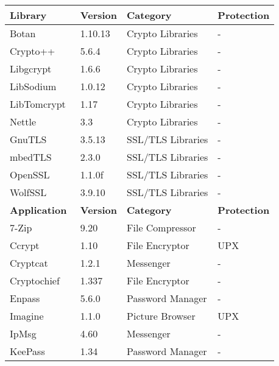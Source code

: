 \begin{table}[t]
\scriptsize 
\centering
\begin{tabular}{p{2cm} p{0.8cm} p{2.1cm} p{1.5cm} }
\toprule
\textbf{Library}						& \textbf{Version}	& \textbf{Category}		& \textbf{Protection} \\ 
\midrule
{Botan~\cite{botan_cryptozoo}}				& {1.10.13}			& {Crypto Libraries}		& - \\
{Crypto++~\cite{cryptopp_cryptozoo}}		& {5.6.4}			& {Crypto Libraries}		& - \\
{Libgcrypt~\cite{libgcrypt_cryptozoo}}		& {1.6.6}			& {Crypto Libraries}		& - \\
{LibSodium~\cite{libsodium_cryptozoo}}		& {1.0.12}			& {Crypto Libraries}		& - \\
{LibTomcrypt~\cite{libtomcrypt_cryptozoo}}	& {1.17}			& {Crypto Libraries}		& - \\
{Nettle~\cite{nettle_cryptozoo}}			& {3.3}				& {Crypto Libraries}		& - \\
\midrule
{GnuTLS~\cite{gnutls_cryptozoo}}			& {3.5.13}			& {SSL/TLS Libraries}		& - \\
{mbedTLS~\cite{mbedtls_cryptozoo}}			& {2.3.0}			& {SSL/TLS Libraries}		& - \\
{OpenSSL~\cite{openssl_cryptozoo}}			& {1.1.0f}			& {SSL/TLS Libraries}		& - \\
{WolfSSL~\cite{wolfssl_cryptozoo}}			& {3.9.10}			& {SSL/TLS Libraries}		& - \\ 
\bottomrule
\toprule
\textbf{Application}					& \textbf{Version}	& \textbf{Category}		& \textbf{Protection} \\ 
\midrule
{7-Zip~\cite{7zip_cryptozoo}}				& {9.20}			& {File Compressor}			& - \\
{Ccrypt~\cite{ccrypt_cryptozoo}}			& {1.10}			& {File Encryptor}			& UPX \\
{Cryptcat~\cite{cryptcat_cryptozoo}}		& {1.2.1}			& {Messenger}				& - \\
{Cryptochief~\cite{cryptochief_cryptozoo}}	& {1.337}			& {File Encryptor}			& - \\
{Enpass~\cite{enpass_cryptozoo}}			& {5.6.0}			& {Password Manager}		& - \\
{Imagine~\cite{imagine_cryptozoo}}			& {1.1.0}			& {Picture Browser}			& UPX \\
{IpMsg~\cite{ipmsg_cryptozoo}}				& {4.60}			& {Messenger}				& - \\
{KeePass~\cite{keepass_cryptozoo}}			& {1.34}			& {Password Manager}		& - \\ 

\end{tabular}
\end{table}
